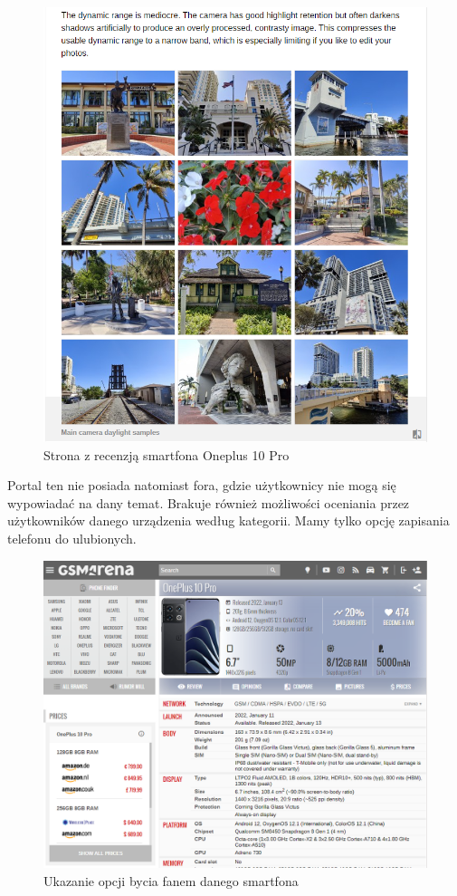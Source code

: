 \begin{figure}[H]
    \centering
    \includegraphics[width=15cm]{img/GSM Arena/ReviewWithPhotos.png}
    \caption{Strona z recenzją smartfona Oneplus 10 Pro}
    \label{GSM_Arena_2}
\end{figure}
Portal ten nie posiada natomiast fora, gdzie użytkownicy nie mogą się wypowiadać na dany temat. Brakuje również możliwości oceniania przez użytkowników danego urządzenia według kategorii. Mamy tylko opcję zapisania telefonu do ulubionych.
\begin{figure}[H]
    \centering
    \includegraphics[width=15cm]{img/GSM Arena/DetailsPageWithPrices.png}
    \caption{Ukazanie opcji bycia fanem danego smartfona}
    \label{GSM_Arena_3}
\end{figure}
